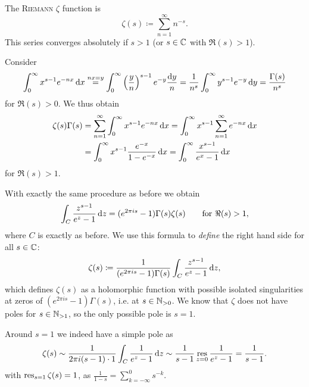 \documentclass[a4paper,english]{article}
\begin{document}
The \textsc{Riemann} $\zeta$ function is
\begin{equation*}
    \zeta(s)
    \coloneqq \sum_{n = 1}^{\infty} n^{-s}.
\end{equation*}
This series converges absolutely if $s > 1$ (or $s \in \operatorname{\mathbb{C}}$ with $\Re(s) > 1$).

Consider
\begin{equation*}
    \int_{0}^{\infty} x^{s - 1} e^{- n x} \mathop{}\!\mathrm{d}{x}
    \overset{n x = y}{=}
    \int_{0}^{\infty} \left(\frac{y}{n}\right)^{s - 1} e^{- y} \frac{\mathop{}\!\mathrm{d}{y}}{n}
    = \frac{1}{n^s} \int_{0}^{\infty} y^{s - 1} e^{- y} \mathop{}\!\mathrm{d}{y}
    = \frac{\Gamma(s)}{n^s}
\end{equation*}
for $\Re(s) > 0$.
We thus obtain
\begin{align*}
    \zeta(s) \Gamma(s)
    & = \sum_{n = 1}^{\infty} \int_{0}^{\infty} x^{s - 1} e^{- n x} \mathop{}\!\mathrm{d}{x}
    = \int_{0}^{\infty} x^{s - 1} \sum_{n = 1}^{\infty} e^{- n x} \mathop{}\!\mathrm{d}{x} \\
    & = \int_{0}^{\infty} x^{s - 1} \frac{e^{-x}}{1 - e^{-x}} \mathop{}\!\mathrm{d}{x}
    = \int_{0}^{\infty}\frac{x^{s - 1}}{e^x - 1} \mathop{}\!\mathrm{d}{x}
\end{align*}
for $\Re(s) > 1$.

With exactly the same procedure as before we obtain
\begin{equation} \label{eq:gammazeta}
    \int_{C} \frac{z^{s - 1}}{e^{z} - 1} \mathop{}\!\mathrm{d}{z}
    = (e^{2 \pi i s} - 1) \Gamma(s) \zeta(s)
    \qquad \text{for } \Re(s) > 1,
\end{equation}
where $C$ is exactly as before.
We use this formula to \emph{define} the right hand side for all $s \in \operatorname{\mathbb{C}}$:
\begin{equation} \label{eq:zeta}
    \zeta(s)
    \coloneqq \frac{1}{(e^{2 \pi i s} - 1) \Gamma(s)} \int_{C} \frac{z^{s - 1}}{e^{z} - 1} \mathop{}\!\mathrm{d}{z},
\end{equation}
which defines $\zeta(s)$ as a holomorphic function with possible isolated singularities at zeros of $(e^{2 \pi i s} - 1) \Gamma(s)$, i.e. at $s \in \operatorname{\mathbb{N}}_{> 0}$.
We know that $\zeta$ does not have poles for $s \in \operatorname{\mathbb{N}}_{> 1}$, so the only possible pole is $s = 1$.

Around $s = 1$ we indeed have a simple pole as 
\begin{equation*}
    \zeta(s)
    \sim \frac{1}{2 \pi i (s - 1) \cdot 1} \int_{C} \frac{1}{e^{z} - 1} \mathop{}\!\mathrm{d}{z}
    \sim \frac{1}{s - 1} \operatorname*{res}_{z = 0} \frac{1}{e^z - 1}
    = \frac{1}{s - 1}.
\end{equation*}
with $\operatorname*{res}_{s = 1} \zeta(s) = 1$, as $\frac{1}{1 - s} = \sum_{k = - \infty}^{0} s^{-k}$.
\end{document}
